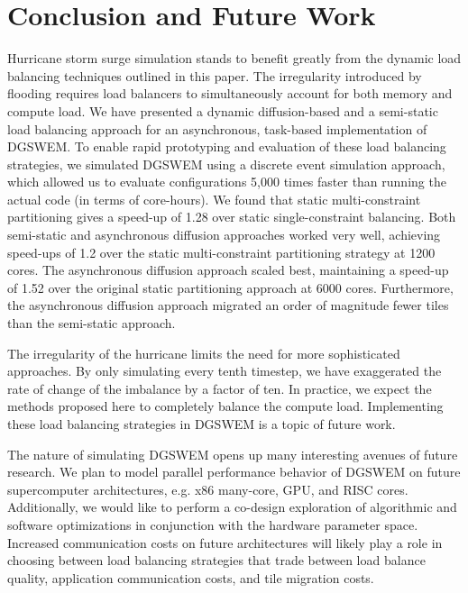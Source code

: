 \section{Conclusion and Future Work}


Hurricane storm surge simulation stands to benefit greatly from the dynamic load balancing techniques outlined in this paper. 
The irregularity introduced by flooding requires load balancers to simultaneously account for both memory and compute load.
We have presented a dynamic diffusion-based and a semi-static load balancing approach for an asynchronous, task-based implementation of DGSWEM.
To enable rapid prototyping and evaluation of these load balancing strategies, we simulated DGSWEM using a discrete event simulation approach, which
allowed us to evaluate configurations 5,000 times faster than running the actual code (in terms of core-hours).
We found that static multi-constraint partitioning gives a speed-up of 1.28 over static single-constraint balancing. Both semi-static and asynchronous diffusion approaches worked very well, achieving speed-ups of 1.2 over the static multi-constraint partitioning strategy at 1200 cores. The asynchronous diffusion approach scaled best, maintaining a speed-up of 1.52 over the original static partitioning approach at 6000 cores. Furthermore, the asynchronous diffusion approach migrated an order of magnitude fewer tiles than the semi-static approach.

The irregularity of the hurricane limits the need for more sophisticated approaches. By only simulating every tenth timestep, we have exaggerated the rate of change of the imbalance by a factor of ten. In practice, we expect the methods proposed here to completely balance the compute load. Implementing these load balancing strategies in DGSWEM is a topic of future work.

The nature of simulating DGSWEM opens up many interesting avenues of future research.
We plan to model parallel performance behavior of DGSWEM on future supercomputer architectures, e.g. x86 many-core, GPU, and RISC cores.
Additionally, we would like to perform a co-design exploration of algorithmic and software optimizations in conjunction with the hardware parameter space.
Increased communication costs on future architectures will likely play a role in choosing between load balancing strategies that trade between load balance quality, application communication costs, and tile migration costs.
